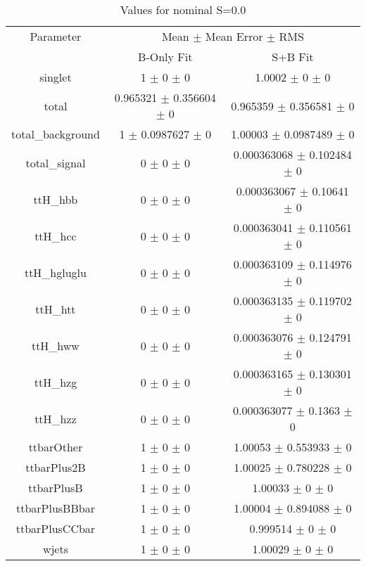 \begin{table}
\centering
\caption{Values for nominal S=0.0}
\begin{tabular}{ccc}
\toprule
Parameter & \multicolumn{2}{c}{Mean $\pm$ Mean Error $\pm$ RMS}\\
 & B-Only Fit & S+B Fit\\
\midrule
singlet & \num{1} $\pm$ \num{0} $\pm$ \num{0} & \num{1.0002} $\pm$ \num{0} $\pm$ \num{0}\\
total & \num{0.965321} $\pm$ \num{0.356604} $\pm$ \num{0} & \num{0.965359} $\pm$ \num{0.356581} $\pm$ \num{0}\\
total\_background & \num{1} $\pm$ \num{0.0987627} $\pm$ \num{0} & \num{1.00003} $\pm$ \num{0.0987489} $\pm$ \num{0}\\
total\_signal & \num{0} $\pm$ \num{0} $\pm$ \num{0} & \num{0.000363068} $\pm$ \num{0.102484} $\pm$ \num{0}\\
ttH\_hbb & \num{0} $\pm$ \num{0} $\pm$ \num{0} & \num{0.000363067} $\pm$ \num{0.10641} $\pm$ \num{0}\\
ttH\_hcc & \num{0} $\pm$ \num{0} $\pm$ \num{0} & \num{0.000363041} $\pm$ \num{0.110561} $\pm$ \num{0}\\
ttH\_hgluglu & \num{0} $\pm$ \num{0} $\pm$ \num{0} & \num{0.000363109} $\pm$ \num{0.114976} $\pm$ \num{0}\\
ttH\_htt & \num{0} $\pm$ \num{0} $\pm$ \num{0} & \num{0.000363135} $\pm$ \num{0.119702} $\pm$ \num{0}\\
ttH\_hww & \num{0} $\pm$ \num{0} $\pm$ \num{0} & \num{0.000363076} $\pm$ \num{0.124791} $\pm$ \num{0}\\
ttH\_hzg & \num{0} $\pm$ \num{0} $\pm$ \num{0} & \num{0.000363165} $\pm$ \num{0.130301} $\pm$ \num{0}\\
ttH\_hzz & \num{0} $\pm$ \num{0} $\pm$ \num{0} & \num{0.000363077} $\pm$ \num{0.1363} $\pm$ \num{0}\\
ttbarOther & \num{1} $\pm$ \num{0} $\pm$ \num{0} & \num{1.00053} $\pm$ \num{0.553933} $\pm$ \num{0}\\
ttbarPlus2B & \num{1} $\pm$ \num{0} $\pm$ \num{0} & \num{1.00025} $\pm$ \num{0.780228} $\pm$ \num{0}\\
ttbarPlusB & \num{1} $\pm$ \num{0} $\pm$ \num{0} & \num{1.00033} $\pm$ \num{0} $\pm$ \num{0}\\
ttbarPlusBBbar & \num{1} $\pm$ \num{0} $\pm$ \num{0} & \num{1.00004} $\pm$ \num{0.894088} $\pm$ \num{0}\\
ttbarPlusCCbar & \num{1} $\pm$ \num{0} $\pm$ \num{0} & \num{0.999514} $\pm$ \num{0} $\pm$ \num{0}\\
wjets & \num{1} $\pm$ \num{0} $\pm$ \num{0} & \num{1.00029} $\pm$ \num{0} $\pm$ \num{0}\\
\bottomrule
\end{tabular}
\end{table}